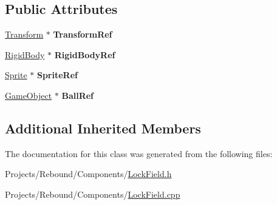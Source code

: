 \subsection*{Public Attributes}
\begin{DoxyCompactItemize}
\item 
\hypertarget{classDCEngine_1_1Components_1_1LockField_ae5d9898f55f02dbb27e8867ccf56aec1}{\hyperlink{classDCEngine_1_1Components_1_1Transform}{Transform} $\ast$ {\bfseries Transform\-Ref}}\label{classDCEngine_1_1Components_1_1LockField_ae5d9898f55f02dbb27e8867ccf56aec1}

\item 
\hypertarget{classDCEngine_1_1Components_1_1LockField_a7b01d998733a7c6c3be654b768b7873f}{\hyperlink{classDCEngine_1_1Components_1_1RigidBody}{Rigid\-Body} $\ast$ {\bfseries Rigid\-Body\-Ref}}\label{classDCEngine_1_1Components_1_1LockField_a7b01d998733a7c6c3be654b768b7873f}

\item 
\hypertarget{classDCEngine_1_1Components_1_1LockField_a096591dfc2efc9aab2b258b5776c8276}{\hyperlink{classDCEngine_1_1Components_1_1Sprite}{Sprite} $\ast$ {\bfseries Sprite\-Ref}}\label{classDCEngine_1_1Components_1_1LockField_a096591dfc2efc9aab2b258b5776c8276}

\item 
\hypertarget{classDCEngine_1_1Components_1_1LockField_a8585c40548f85460c0ce57ce2a867f2c}{\hyperlink{classDCEngine_1_1GameObject}{Game\-Object} $\ast$ {\bfseries Ball\-Ref}}\label{classDCEngine_1_1Components_1_1LockField_a8585c40548f85460c0ce57ce2a867f2c}

\end{DoxyCompactItemize}
\subsection*{Additional Inherited Members}


The documentation for this class was generated from the following files\-:\begin{DoxyCompactItemize}
\item 
Projects/\-Rebound/\-Components/\hyperlink{LockField_8h}{Lock\-Field.\-h}\item 
Projects/\-Rebound/\-Components/\hyperlink{LockField_8cpp}{Lock\-Field.\-cpp}\end{DoxyCompactItemize}
